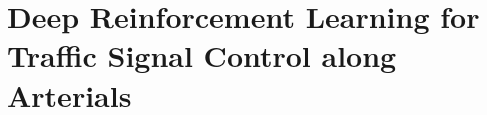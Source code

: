 \chapter{Deep Reinforcement Learning for Traffic Signal Control along Arterials}
\label{chap:arterial}